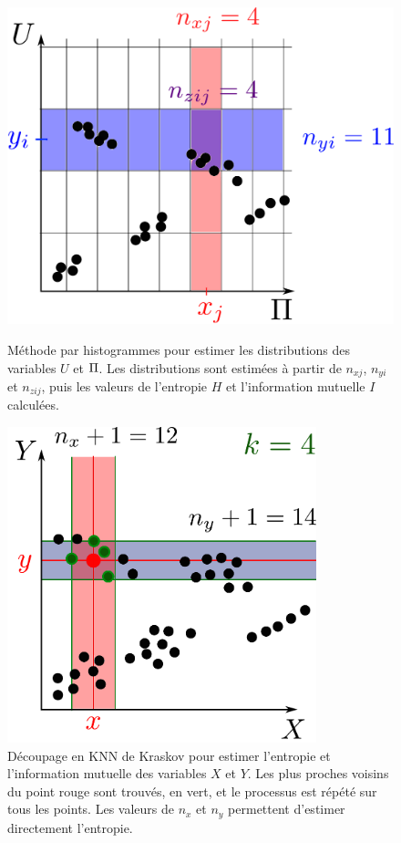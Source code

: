 \begin{figure}
    \begin{minipage}{0.4\textwidth}
    \centering
    \includegraphics[width=\textwidth]{boxes}
    \caption{Méthode par histogrammes pour estimer les distributions des variables $U$ et $\Pi$. Les distributions sont estimées à partir de $n_{xj}$, $n_{yi}$ et $n_{zij}$, puis les valeurs de l'entropie $H$ et l'information mutuelle $I$ calculées.}
    \label{fig:binning}  
    \end{minipage}
    \hfill
    \begin{minipage}{0.4\textwidth}    
            \centering
            \includegraphics[width=0.8\textwidth]{kraskov.pdf}
            \caption{Découpage en KNN de Kraskov pour estimer l'entropie et l'information mutuelle des variables $X$ et $Y$. Les plus proches voisins du point rouge sont trouvés, en vert, et le processus est répété sur tous les points. Les valeurs de $n_x$ et $n_y$ permettent d'estimer directement l'entropie.}
            \label{fig:kraskov}
    \end{minipage}
    \end{figure}

